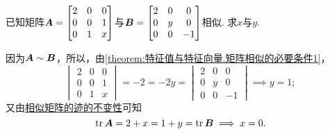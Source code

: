 \begin{example}
已知矩阵\(\boldsymbol{A} = \begin{bmatrix}
	2 & 0 & 0 \\
	0 & 0 & 1 \\
	0 & 1 & x
\end{bmatrix}\)与\(\boldsymbol{B} = \begin{bmatrix}
	2 & 0 & 0 \\
	0 & y & 0 \\
	0 & 0 & -1
\end{bmatrix}\)相似.
求\(x\)与\(y\).
\begin{solution}
因为\(\boldsymbol{A}\sim\boldsymbol{B}\)，所以，由\cref{theorem:特征值与特征向量.矩阵相似的必要条件1}，
\begin{equation*}
	\begin{vmatrix}
		2 & 0 & 0 \\
		0 & 0 & 1 \\
		0 & 1 & x
	\end{vmatrix}
	= -2 = -2y =
	\begin{vmatrix}
		2 & 0 & 0 \\
		0 & y & 0 \\
		0 & 0 & -1
	\end{vmatrix}
	\implies y = 1;
\end{equation*}
又由\hyperref[theorem:特征值与特征向量.相似矩阵的迹的不变性]{相似矩阵的迹的不变性}可知\begin{equation*}
	\tr\boldsymbol{A} = 2+x
	= 1+y = \tr\boldsymbol{B}
	\implies
	x = 0.
\end{equation*}
\end{solution}
\end{example}
